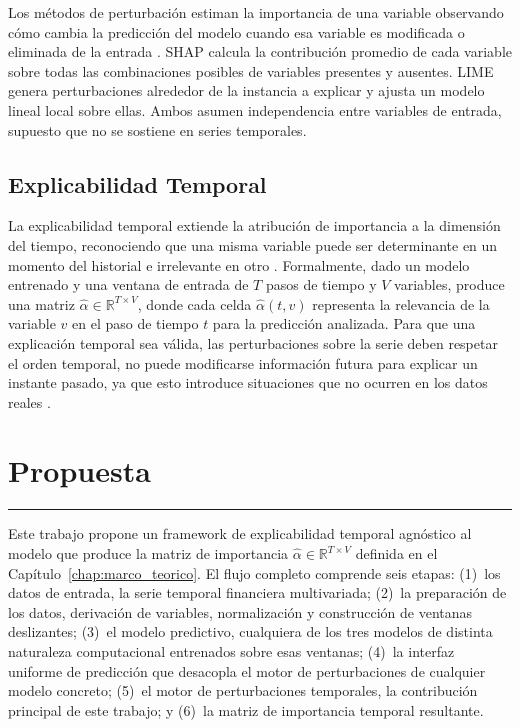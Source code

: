 Los métodos de perturbación estiman la importancia de una variable observando cómo cambia la predicción del modelo cuando esa variable es modificada o eliminada de la entrada \cite{arsenault2025}. SHAP calcula la contribución promedio de cada variable sobre todas las combinaciones posibles de variables presentes y ausentes. LIME genera perturbaciones alrededor de la instancia a explicar y ajusta un modelo lineal local sobre ellas. Ambos asumen independencia entre variables de entrada, supuesto que no se sostiene en series temporales.

\section{Explicabilidad Temporal}

La explicabilidad temporal extiende la atribución de importancia a la dimensión del tiempo, reconociendo que una misma variable puede ser determinante en un momento del historial e irrelevante en otro \cite{tonekaboni2020}. Formalmente, dado un modelo entrenado y una ventana de entrada de $T$ pasos de tiempo y $V$ variables, produce una matriz $\hat{\alpha} \in \mathbb{R}^{T \times V}$, donde cada celda $\hat{\alpha}(t,v)$ representa la relevancia de la variable $v$ en el paso de tiempo $t$ para la predicción analizada. Para que una explicación temporal sea válida, las perturbaciones sobre la serie deben respetar el orden temporal, no puede modificarse información futura para explicar un instante pasado, ya que esto introduce situaciones que no ocurren en los datos reales \cite{tonekaboni2020, crabbe2021}.


\chapter{Propuesta}
\hrule \bigskip \vspace*{1cm}

\label{chap:propuesta}

Este trabajo propone un framework de explicabilidad temporal agnóstico al modelo que produce la matriz de importancia $\hat{\alpha} \in \mathbb{R}^{T \times V}$ definida en el Capítulo~\ref{chap:marco_teorico}. El flujo completo comprende seis etapas: (1)~los datos de entrada, la serie temporal financiera multivariada; (2)~la preparación de los datos, derivación de variables, normalización y construcción de ventanas deslizantes; (3)~el modelo predictivo, cualquiera de los tres modelos de distinta naturaleza computacional entrenados sobre esas ventanas; (4)~la interfaz uniforme de predicción que desacopla el motor de perturbaciones de cualquier modelo concreto; (5)~el motor de perturbaciones temporales, la contribución principal de este trabajo; y (6)~la matriz de importancia temporal resultante.

